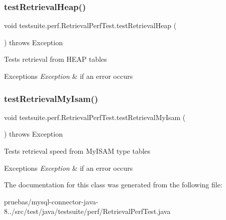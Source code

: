 \subsubsection{\texorpdfstring{test\+Retrieval\+Heap()}{testRetrievalHeap()}}
{\footnotesize\ttfamily void testsuite.\+perf.\+Retrieval\+Perf\+Test.\+test\+Retrieval\+Heap (\begin{DoxyParamCaption}{ }\end{DoxyParamCaption}) throws Exception}

Tests retrieval from H\+E\+AP tables


\begin{DoxyExceptions}{Exceptions}
{\em Exception} & if an error occurs \\
\hline
\end{DoxyExceptions}
\mbox{\label{classtestsuite_1_1perf_1_1_retrieval_perf_test_a7228eef6533f6ff301ae53d044e25f9e}} 
\subsubsection{\texorpdfstring{test\+Retrieval\+My\+Isam()}{testRetrievalMyIsam()}}
{\footnotesize\ttfamily void testsuite.\+perf.\+Retrieval\+Perf\+Test.\+test\+Retrieval\+My\+Isam (\begin{DoxyParamCaption}{ }\end{DoxyParamCaption}) throws Exception}

Tests retrieval speed from My\+I\+S\+AM type tables


\begin{DoxyExceptions}{Exceptions}
{\em Exception} & if an error occurs \\
\hline
\end{DoxyExceptions}


The documentation for this class was generated from the following file\+:\begin{DoxyCompactItemize}
\item 
pruebas/mysql-\/connector-\/java-\/8../src/test/java/testsuite/perf/Retrieval\+Perf\+Test.\+java\end{DoxyCompactItemize}
